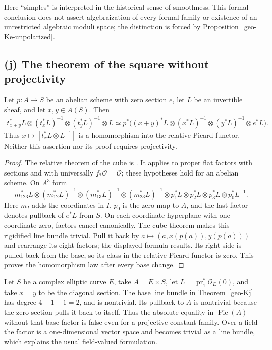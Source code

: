 Here ``simples'' is interpreted in the historical sense of smoothness.
This formal conclusion does not assert algebraization of every formal
family or existence of an unrestricted algebraic moduli space; the
distinction is forced by Proposition~\ref{geo-Ke-unpolarized}.

\subsection{(j) The theorem of the square without projectivity}

\begin{theorem}
\label{geo-Kj}
Let $p:A\to S$ be an abelian scheme with zero section $e$, let $L$ be an
invertible sheaf, and let $x,y\in A(S)$. Then
\begin{align*}
 t_{x+y}^*L\otimes(t_x^*L)^{-1}\otimes(t_y^*L)^{-1}\otimes L
 \simeq p^*\bigl((x+y)^*L\otimes(x^*L)^{-1}
 \otimes(y^*L)^{-1}\otimes e^*L\bigr).
\end{align*}
Thus $x\mapsto[t_x^*L\otimes L^{-1}]$ is a homomorphism into the relative
Picard functor. Neither this assertion nor its proof requires projectivity.
\end{theorem}
\begin{proof}
The relative theorem of the cube is
\cite[VII, Theorem 3.1, pp.~VII-6--VII-8]{RaynaudOrsay1967}. It applies to
proper flat factors with sections and with universally
$f_*\mathcal O=\mathcal O$; these hypotheses hold for an abelian scheme.
On $A^3$ form
\[
 m_{123}^*L\otimes(m_{12}^*L)^{-1}\otimes(m_{13}^*L)^{-1}
 \otimes(m_{23}^*L)^{-1}\otimes p_1^*L\otimes p_2^*L
 \otimes p_3^*L\otimes p_0^*L^{-1}.
\]
Here $m_I$ adds the coordinates in $I$, $p_0$ is the zero map to $A$, and the last factor denotes
pullback of $e^*L$ from $S$. On each coordinate hyperplane with one
coordinate zero, factors cancel canonically. The cube theorem makes this
rigidified line bundle trivial. Pull it back by
$a\mapsto(a,x(p(a)),y(p(a)))$ and rearrange its eight factors; the
displayed formula results. Its right side is pulled back from the base,
so its class in the relative Picard functor is zero. This proves the
homomorphism law after every base change.
\end{proof}

\begin{example}
\label{geo-Kj-base}
Let $S$ be a complex elliptic curve $E$, take $A=E\times S$, let
$L=\operatorname{pr}_1^*\mathcal O_E(0)$, and take $x=y$ to be the
diagonal section. The base line bundle in Theorem~\ref{geo-Kj} has degree
$4-1-1=2$, and is nontrivial. Its pullback to $A$ is nontrivial because
the zero section pulls it back to itself. Thus the absolute equality in
$\operatorname{Pic}(A)$ without that base factor is false even for a
projective constant family. Over a field the factor is a one-dimensional
vector space and becomes trivial as a line bundle, which explains the
usual field-valued formulation.
\end{example}
